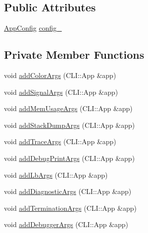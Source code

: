 \subsection*{Public Attributes}
\begin{DoxyCompactItemize}
\item 
\hyperlink{structvt_1_1arguments_1_1_app_config}{App\+Config} \hyperlink{structvt_1_1arguments_1_1_arg_config_af30e0eae1ac1b29f7c85c25636109a9e}{config\+\_\+}
\end{DoxyCompactItemize}
\subsection*{Private Member Functions}
\begin{DoxyCompactItemize}
\item 
void \hyperlink{structvt_1_1arguments_1_1_arg_config_a88f975427c3408ac8ada2add79fb9692}{add\+Color\+Args} (C\+L\+I\+::\+App \&app)
\item 
void \hyperlink{structvt_1_1arguments_1_1_arg_config_ac8c405111103fc7bef367cce277235d4}{add\+Signal\+Args} (C\+L\+I\+::\+App \&app)
\item 
void \hyperlink{structvt_1_1arguments_1_1_arg_config_aef7cb73c09dd2f554a550c2ab54b66f0}{add\+Mem\+Usage\+Args} (C\+L\+I\+::\+App \&app)
\item 
void \hyperlink{structvt_1_1arguments_1_1_arg_config_a0606d4951d3320d9489e65fccc1ab98b}{add\+Stack\+Dump\+Args} (C\+L\+I\+::\+App \&app)
\item 
void \hyperlink{structvt_1_1arguments_1_1_arg_config_ab3de7d531bd7f09c7ea1b37c9e57a02f}{add\+Trace\+Args} (C\+L\+I\+::\+App \&app)
\item 
void \hyperlink{structvt_1_1arguments_1_1_arg_config_afbe3ad33df89d6f702afa1b6e402e9a8}{add\+Debug\+Print\+Args} (C\+L\+I\+::\+App \&app)
\item 
void \hyperlink{structvt_1_1arguments_1_1_arg_config_a4e1787f38e5ed8f4732b9e27011abd24}{add\+Lb\+Args} (C\+L\+I\+::\+App \&app)
\item 
void \hyperlink{structvt_1_1arguments_1_1_arg_config_a8783b70093b5fb9cae74e97b2c428c44}{add\+Diagnostic\+Args} (C\+L\+I\+::\+App \&app)
\item 
void \hyperlink{structvt_1_1arguments_1_1_arg_config_a0504992629228af199a906edc43b4d0a}{add\+Termination\+Args} (C\+L\+I\+::\+App \&app)
\item 
void \hyperlink{structvt_1_1arguments_1_1_arg_config_ad1c8bc76bc17ffd3245331c5cab90f0c}{add\+Debugger\+Args} (C\+L\+I\+::\+App \&app)

\end{DoxyCompactItemize}
